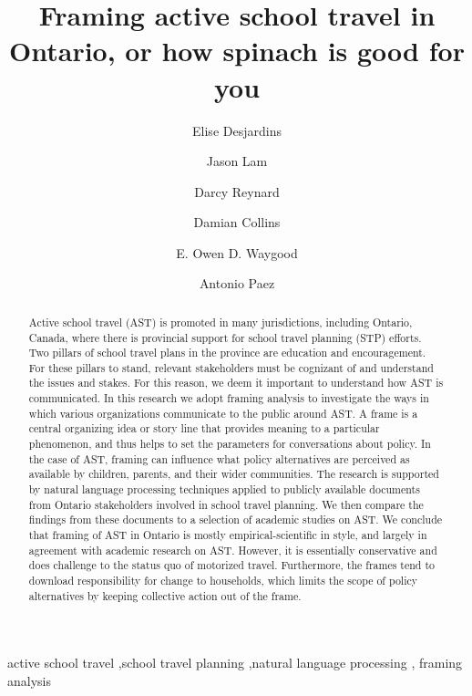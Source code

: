 \documentclass[preprint, 3p,
authoryear]{elsarticle} %
\begin{document}
\begin{frontmatter}

  \title{Framing active school travel in Ontario, or how spinach is good
for you}
    \author[McMaster University]{Elise Desjardins%
  }
    \author[McMaster University]{Jason Lam%
  }
    \author[University of Alberta]{Darcy Reynard%
  }
    \author[University of Alberta]{Damian Collins%
  }
    \author[Polytechnique Montreal]{E. Owen D. Waygood%
  }
    \author[McMaster University]{Antonio Paez%
  }
  
  \begin{abstract}
  Active school travel (AST) is promoted in many jurisdictions,
  including Ontario, Canada, where there is provincial support for
  school travel planning (STP) efforts. Two pillars of school travel
  plans in the province are education and encouragement. For these
  pillars to stand, relevant stakeholders must be cognizant of and
  understand the issues and stakes. For this reason, we deem it
  important to understand how AST is communicated. In this research we
  adopt framing analysis to investigate the ways in which various
  organizations communicate to the public around AST. A frame is a
  central organizing idea or story line that provides meaning to a
  particular phenomenon, and thus helps to set the parameters for
  conversations about policy. In the case of AST, framing can influence
  what policy alternatives are perceived as available by children,
  parents, and their wider communities. The research is supported by
  natural language processing techniques applied to publicly available
  documents from Ontario stakeholders involved in school travel
  planning. We then compare the findings from these documents to a
  selection of academic studies on AST. We conclude that framing of AST
  in Ontario is mostly empirical-scientific in style, and largely in
  agreement with academic research on AST. However, it is essentially
  conservative and does challenge to the status quo of motorized travel.
  Furthermore, the frames tend to download responsibility for change to
  households, which limits the scope of policy alternatives by keeping
  collective action out of the frame.
  \end{abstract}
    \begin{keyword}
    active school travel \sep school travel planning \sep natural
language processing \sep 
    framing analysis
  \end{keyword}
  

\end{frontmatter}
\end{document}
